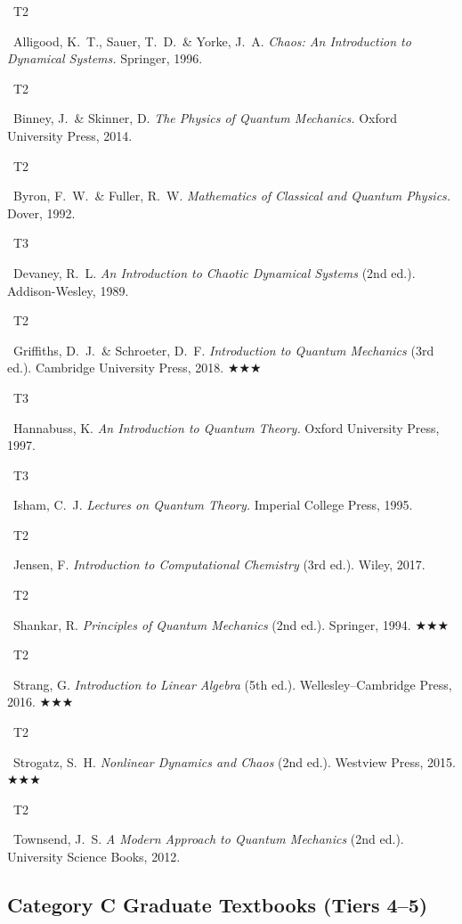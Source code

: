\documentclass[11pt,a4paper]{article}
\newcommand{\tierbadge}[2]{%
  \colorbox{#1}{\small\bfseries\color{white}\strut\ #2\ }%
}
\newcommand{\essential}{$\bigstar\bigstar\bigstar$}
\begin{document}
\begin{tcolorbox}[catbox]
\begin{enumerate}[leftmargin=2.5em, label=\textbf{[B\arabic*]}, itemsep=5pt]
  \item \tierbadge{t2blue}{T2}\ Alligood, K.~T., Sauer, T.~D.\ \& Yorke, J.~A. \textit{Chaos: An Introduction to Dynamical Systems.} Springer, 1996.
  \item \tierbadge{t2blue}{T2}\ Binney, J.\ \& Skinner, D. \textit{The Physics of Quantum Mechanics.} Oxford University Press, 2014.
  \item \tierbadge{t2blue}{T2}\ Byron, F.~W.\ \& Fuller, R.~W. \textit{Mathematics of Classical and Quantum Physics.} Dover, 1992.
  \item \tierbadge{t3purple}{T3}\ Devaney, R.~L. \textit{An Introduction to Chaotic Dynamical Systems} (2nd ed.). Addison-Wesley, 1989.
  \item \tierbadge{t2blue}{T2}\ Griffiths, D.~J.\ \& Schroeter, D.~F. \textit{Introduction to Quantum Mechanics} (3rd ed.). Cambridge University Press, 2018. \essential
  \item \tierbadge{t3purple}{T3}\ Hannabuss, K. \textit{An Introduction to Quantum Theory.} Oxford University Press, 1997.
  \item \tierbadge{t3purple}{T3}\ Isham, C.~J. \textit{Lectures on Quantum Theory.} Imperial College Press, 1995.
  \item \tierbadge{t2blue}{T2}\ Jensen, F. \textit{Introduction to Computational Chemistry} (3rd ed.). Wiley, 2017.
  \item \tierbadge{t2blue}{T2}\ Shankar, R. \textit{Principles of Quantum Mechanics} (2nd ed.). Springer, 1994. \essential
  \item \tierbadge{t2blue}{T2}\ Strang, G. \textit{Introduction to Linear Algebra} (5th ed.). Wellesley--Cambridge Press, 2016. \essential
  \item \tierbadge{t2blue}{T2}\ Strogatz, S.~H. \textit{Nonlinear Dynamics and Chaos} (2nd ed.). Westview Press, 2015. \essential
  \item \tierbadge{t2blue}{T2}\ Townsend, J.~S. \textit{A Modern Approach to Quantum Mechanics} (2nd ed.). University Science Books, 2012.
\end{enumerate}
\end{tcolorbox}

\subsection*{Category C \quad Graduate Textbooks (Tiers 4--5)}
\end{document}
